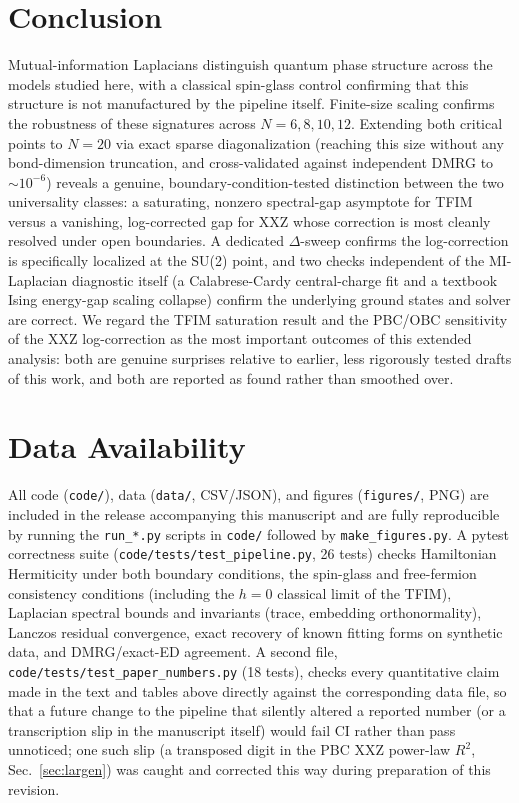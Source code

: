 \documentclass[aps,prx,reprint,amsmath,amssymb,superscriptaddress]{revtex4-2}
\begin{document}
\section{Conclusion}

Mutual-information Laplacians distinguish quantum phase structure across the models studied here,
with a classical spin-glass control confirming that this structure is not manufactured by the
pipeline itself. Finite-size scaling confirms the robustness of these signatures across
$N=6,8,10,12$. Extending both critical points to $N=20$ via exact sparse diagonalization (reaching
this size without any bond-dimension truncation, and cross-validated against independent DMRG to
$\sim10^{-6}$) reveals a genuine, boundary-condition-tested distinction between the two
universality classes: a saturating, nonzero spectral-gap asymptote for TFIM versus a vanishing,
log-corrected gap for XXZ whose correction is most cleanly resolved under open boundaries. A
dedicated $\Delta$-sweep confirms the log-correction is specifically localized at the SU(2) point,
and two checks independent of the MI-Laplacian diagnostic itself (a Calabrese-Cardy central-charge
fit and a textbook Ising energy-gap scaling collapse) confirm the underlying ground states and
solver are correct. We regard the TFIM saturation result and the PBC/OBC sensitivity of the XXZ
log-correction as the most important outcomes of this extended analysis: both are genuine surprises
relative to earlier, less rigorously tested drafts of this work, and both are reported as found
rather than smoothed over.

\section*{Data Availability}
All code (\texttt{code/}), data (\texttt{data/}, CSV/JSON), and figures (\texttt{figures/}, PNG) are
included in the release accompanying this manuscript and are fully reproducible by running the
\texttt{run\_*.py} scripts in \texttt{code/} followed by \texttt{make\_figures.py}. A pytest
correctness suite (\texttt{code/tests/test\_pipeline.py}, 26 tests) checks Hamiltonian Hermiticity
under both boundary conditions, the spin-glass and free-fermion consistency conditions (including the
$h=0$ classical limit of the TFIM), Laplacian spectral bounds and invariants (trace, embedding
orthonormality), Lanczos residual convergence, exact recovery of known fitting forms on synthetic
data, and DMRG/exact-ED agreement. A second file, \texttt{code/tests/test\_paper\_numbers.py} (18
tests), checks every quantitative claim made in the text and tables above directly against the
corresponding data file, so that a future change to the pipeline that silently altered a reported
number (or a transcription slip in the manuscript itself) would fail CI rather than pass
unnoticed; one such slip (a transposed digit in the PBC XXZ power-law $R^2$, Sec.~\ref{sec:largen})
was caught and corrected this way during preparation of this revision.
\end{document}
